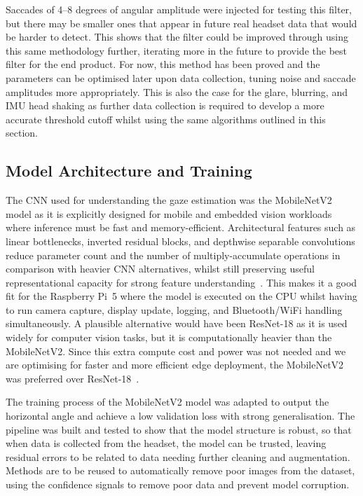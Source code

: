 Saccades of 4--8 degrees of angular amplitude were injected for testing this filter, but there may be smaller ones that appear in future real headset data that would be harder to detect. This shows that the filter could be improved through using this same methodology further, iterating more in the future to provide the best filter for the end product. For now, this method has been proved and the parameters can be optimised later upon data collection, tuning noise and saccade amplitudes more appropriately. This is also the case for the glare, blurring, and IMU head shaking as further data collection is required to develop a more accurate threshold cutoff whilst using the same algorithms outlined in this section.

\subsection{Model Architecture and Training}

The CNN used for understanding the gaze estimation was the MobileNetV2 model as it is explicitly designed for mobile and embedded vision workloads where inference must be fast and memory-efficient. Architectural features such as linear bottlenecks, inverted residual blocks, and depthwise separable convolutions reduce parameter count and the number of multiply-accumulate operations in comparison with heavier CNN alternatives, whilst still preserving useful representational capacity for strong feature understanding~\cite{sandler2018mobilenetv2}. This makes it a good fit for the Raspberry Pi~5 where the model is executed on the CPU whilst having to run camera capture, display update, logging, and Bluetooth/WiFi handling simultaneously. A plausible alternative would have been ResNet-18 as it is used widely for computer vision tasks, but it is computationally heavier than the MobileNetV2. Since this extra compute cost and power was not needed and we are optimising for faster and more efficient edge deployment, the MobileNetV2 was preferred over ResNet-18~\cite{he2016deep}.

The training process of the MobileNetV2 model was adapted to output the horizontal angle and achieve a low validation loss with strong generalisation. The pipeline was built and tested to show that the model structure is robust, so that when data is collected from the headset, the model can be trusted, leaving residual errors to be related to data needing further cleaning and augmentation. Methods are to be reused to automatically remove poor images from the dataset, using the confidence signals to remove poor data and prevent model corruption.


